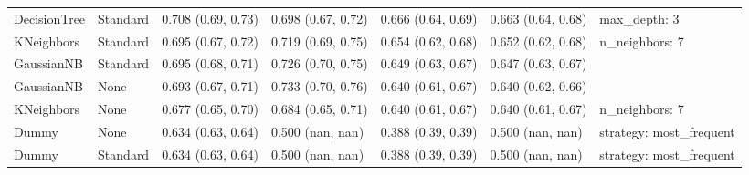 \begin{tabular}{lllllll}
DecisionTree & Standard & 0.708 (0.69, 0.73) & 0.698 (0.67, 0.72) & 0.666 (0.64, 0.69) & 0.663 (0.64, 0.68) & {{max\_depth: 3}} \\
KNeighbors & Standard & 0.695 (0.67, 0.72) & 0.719 (0.69, 0.75) & 0.654 (0.62, 0.68) & 0.652 (0.62, 0.68) & {{n\_neighbors: 7}} \\
GaussianNB & Standard & 0.695 (0.68, 0.71) & 0.726 (0.70, 0.75) & 0.649 (0.63, 0.67) & 0.647 (0.63, 0.67) & {{}} \\
GaussianNB & None & 0.693 (0.67, 0.71) & 0.733 (0.70, 0.76) & 0.640 (0.61, 0.67) & 0.640 (0.62, 0.66) & {{}} \\
KNeighbors & None & 0.677 (0.65, 0.70) & 0.684 (0.65, 0.71) & 0.640 (0.61, 0.67) & 0.640 (0.61, 0.67) & {{n\_neighbors: 7}} \\
Dummy & None & 0.634 (0.63, 0.64) & 0.500 (nan, nan) & 0.388 (0.39, 0.39) & 0.500 (nan, nan) & {{strategy: most_frequent}} \\
Dummy & Standard & 0.634 (0.63, 0.64) & 0.500 (nan, nan) & 0.388 (0.39, 0.39) & 0.500 (nan, nan) & {{strategy: most_frequent}} \\
\bottomrule
\end{tabular}

